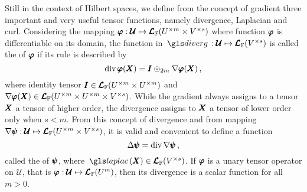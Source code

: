 Still in the context of Hilbert spaces, we define from the concept of gradient three important and very useful tensor functions, namely divergence, Laplacian and curl. Considering the mapping $\pmb{\varphi} : \pmb{\mathcal{U}} \mapsto \pmb{\mathcal{L}}_{\mathbb{F}}(U^{\times m}\times V^{\times s})$ where function $\pmb{\varphi}$ is differentiable on its domain, the function in $\map{\gloref{diverg}}{\pmb{\mathcal{U}}}{\ete{\cam{F}}{V^{\times s}}}$ is called the  of $\pmb{\varphi}$ if its rule is described by
\begin{equation}\label{eq:divergence}
\operatorname{div}{\pmb{\varphi}}(\pmb{X})=\pmb{I}\odot_{2m}\nabla\pmb{\varphi}(\pmb{X})\,,
\end{equation}
where identity tensor $\pmb{I}\in\pmb{\mathcal{L}}_{\mathbb{F}}(U^{\times m}\times U^{\times m})$ and $\nabla\pmb{\varphi}(\pmb{X})\in\pmb{\mathcal{L}}_{\mathbb{F}}(U^{\times m}\times U^{\times m}\times V^{\times s})$. While the gradient always assigns to a tensor $\pmb{X}$ a tensor of higher order, the divergence assigns to $\pmb{X}$ a tensor of lower order only when $s<m$. 
From this concept of divergence and from mapping $\nabla\pmb{\psi} : \pmb{\mathcal{U}} \mapsto \pmb{\mathcal{L}}_{\mathbb{F}}(U^{\times m}\times V^{\times s})$, it is valid and convenient to define a function
\begin{equation}\label{eq:laplace}
\Delta\pmb{\psi}=\operatorname{div}{\nabla\pmb{\psi}}\,,
\end{equation}
called the  of $\pmb{\psi}$, where $\fua{\gloref{laplac}}{\tnr{X}}\in \ete{\cam{F}}{V^{\times s}}$. If $\pmb{\varphi}$ is a unary tensor operator on $\pmb{\mathcal{U}}$, that is $\pmb{\varphi} : \pmb{\mathcal{U}} \mapsto \pmb{\mathcal{L}}_{\mathbb{F}}(U^{m})$, then its divergence is a scalar function for all $m>0$. 


